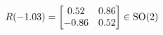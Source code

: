\documentclass[preview]{standalone}
\begin{document}
\begin{align*}
\special{dvisvgm:raw <g id='unique000'>}R(-1.03) = \begin{bmatrix} 0.52 & 0.86 \\ -0.86 & 0.52 \end{bmatrix} \in \text{SO}(2)\special{dvisvgm:raw </g>}
\end{align*}
\end{document}
